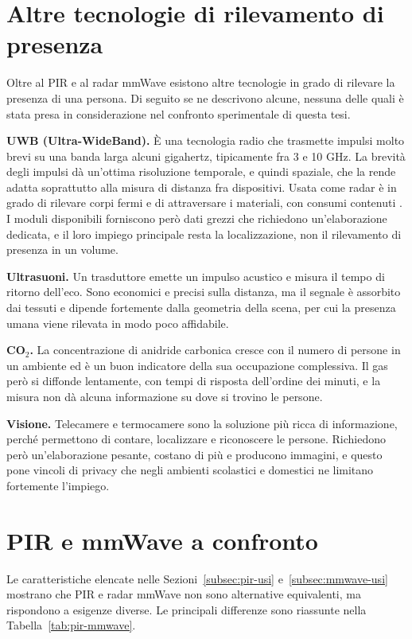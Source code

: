 \FloatBarrier
\section{Altre tecnologie di rilevamento di presenza}
\label{sec:altre}

Oltre al PIR e al radar mmWave esistono altre tecnologie in grado di rilevare la presenza di una persona. Di seguito se ne descrivono alcune, nessuna delle quali è stata presa in considerazione nel confronto sperimentale di questa tesi.

\textbf{UWB (Ultra-WideBand).} È una tecnologia radio che trasmette impulsi molto brevi su una banda larga alcuni gigahertz, tipicamente fra 3 e 10 GHz. La brevità degli impulsi dà un'ottima risoluzione temporale, e quindi spaziale, che la rende adatta soprattutto alla misura di distanza fra dispositivi. Usata come radar è in grado di rilevare corpi fermi e di attraversare i materiali, con consumi contenuti \cite{rfwireless}. I moduli disponibili forniscono però dati grezzi che richiedono un'elaborazione dedicata, e il loro impiego principale resta la localizzazione, non il rilevamento di presenza in un volume.

\textbf{Ultrasuoni.} Un trasduttore emette un impulso acustico e misura il tempo di ritorno dell'eco. Sono economici e precisi sulla distanza, ma il segnale è assorbito dai tessuti e dipende fortemente dalla geometria della scena, per cui la presenza umana viene rilevata in modo poco affidabile.

\textbf{CO$_2$.} La concentrazione di anidride carbonica cresce con il numero di persone in un ambiente ed è un buon indicatore della sua occupazione complessiva. Il gas però si diffonde lentamente, con tempi di risposta dell'ordine dei minuti, e la misura non dà alcuna informazione su dove si trovino le persone.

\textbf{Visione.} Telecamere e termocamere sono la soluzione più ricca di informazione, perché permettono di contare, localizzare e riconoscere le persone. Richiedono però un'elaborazione pesante, costano di più e producono immagini, e questo pone vincoli di privacy che negli ambienti scolastici e domestici ne limitano fortemente l'impiego.

 
 \section{PIR e mmWave a confronto}
\label{sec:confronto}

 Le caratteristiche elencate nelle Sezioni~\ref{subsec:pir-usi} e~\ref{subsec:mmwave-usi} mostrano che PIR e radar mmWave non sono alternative equivalenti, ma rispondono a esigenze diverse. Le principali differenze sono riassunte nella Tabella~\ref{tab:pir-mmwave}.

